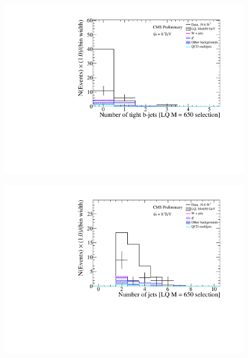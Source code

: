 \documentclass[bigger]{beamer}
\begin{document}
\begin{frame}
\begin{columns}
\begin{column}{0.475\textwidth}
\includegraphics[width=0.8\textwidth]{fig/enu/extra/nBJet_tight_LQ650_enujj.pdf}
\label{sec-1-11-1-1-6}

\includegraphics[width=0.8\textwidth]{fig/enu/extra/nJets_LQ650_enujj.pdf}
\end{column}
\end{columns}
\end{frame}
\end{document}
